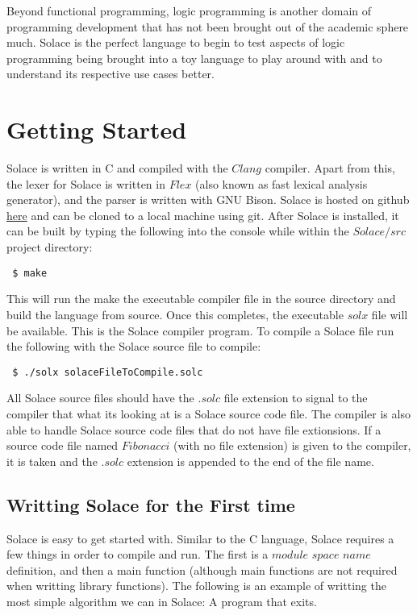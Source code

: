 \documentclass{article}
\begin{document}
Beyond functional programming, logic programming is another domain of programming development that has not been brought out
of the academic sphere much. Solace is the perfect language to begin to test aspects of logic programming being brought into a
toy language to play around with and to understand its respective use cases better.


\section{Getting Started}
Solace is written in C and compiled with the $Clang$ compiler. Apart from this, the lexer for Solace is written in $Flex$
(also known as fast lexical analysis generator), and the parser is written with GNU Bison. Solace is hosted on github
\href{https://github.com/JustSomeCarbon/Solace/tree/main}{here} and can be cloned to a local machine using git. After
Solace is installed, it can be built by typing the following into the console while within the $Solace/src$ project directory:

\begin{lstlisting}
 $ make
\end{lstlisting}

This will run the make the executable compiler file in the source directory and build the language from source.
Once this completes, the executable $solx$ file will be available. This is the Solace compiler program.
To compile a Solace file run the following with the Solace source file to compile:

\begin{lstlisting}
 $ ./solx solaceFileToCompile.solc
\end{lstlisting}

All Solace source files should have the $.solc$ file extension to signal to the compiler that what its looking at is a
Solace source code file. The compiler is also able to handle Solace source code files that do not have file extionsions.
If a source code file named $Fibonacci$ (with no file extension) is given to the compiler, it is taken and the $.solc$ extension
is appended to the end of the file name.

\subsection{Writting Solace for the First time}
Solace is easy to get started with. Similar to the C language, Solace requires a few things in order to compile
and run. The first is a $module$ $space$ $name$ definition, and then a main function (although main functions are not required when
writting library functions). The following is an example of writting the most simple algorithm we can in Solace: A program
that exits.
\end{document}
